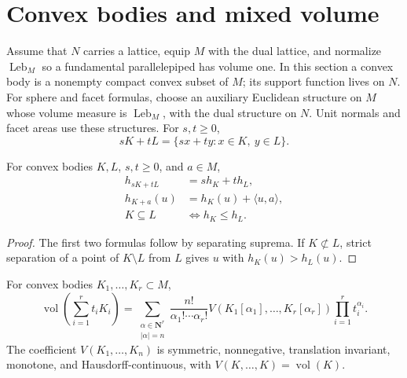 \section{Convex bodies and mixed volume}
\label{sec:appD-mixed-volume}

Assume that \(N\) carries a lattice, equip \(M\) with the dual lattice,
and normalize \(\operatorname{Leb}_M\) so a fundamental parallelepiped
has volume one.  In this section a convex body is a nonempty compact
convex subset of \(M\); its support function lives on \(N\).
For sphere and facet formulas, choose an auxiliary Euclidean structure on
\(M\) whose volume measure is \(\operatorname{Leb}_M\), with the dual
structure on \(N\).  Unit normals and facet areas use these structures.
For \(s,t\geq0\),
\[
 sK+tL=\{sx+ty:x\in K,\ y\in L\}.
\tag{D.14}\label{eq:appD-minkowski-sum}
\]

\begin{lemma}\label{lem:appD-support-calculus}
For convex bodies \(K,L\), \(s,t\geq0\), and \(a\in M\),
\[
\begin{aligned}
 h_{sK+tL}&=s h_K+t h_L,\\
 h_{K+a}(u)&=h_K(u)+\langle u,a\rangle,\\
 K\subseteq L&\Longleftrightarrow h_K\leq h_L.
\end{aligned}
\tag{D.15}\label{eq:appD-support-calculus}
\]
\end{lemma}

\begin{proof}
The first two formulas follow by separating suprema.
If \(K\not\subset L\), strict separation of a point of \(K\setminus L\)
from \(L\) gives \(u\) with \(h_K(u)>h_L(u)\).
\end{proof}

\begin{theorem}\label{thm:appD-minkowski-polynomial}
For convex bodies \(K_1,\ldots,K_r\subset M\),
\[
 \operatorname{vol}\!\left(\sum_{i=1}^r t_iK_i\right)
 =
 \sum_{\substack{\alpha\in\mathbf N^r\\|\alpha|=n}}
 \frac{n!}{\alpha_1!\cdots\alpha_r!}
 V(K_1[\alpha_1],\ldots,K_r[\alpha_r])
 \prod_{i=1}^r t_i^{\alpha_i}.
\tag{D.16}\label{eq:appD-minkowski-polynomial}
\]
The coefficient \(V(K_1,\ldots,K_n)\) is symmetric, nonnegative,
translation invariant, monotone, and Hausdorff-continuous, with
\(V(K,\ldots,K)=\operatorname{vol}(K)\).
\end{theorem}

